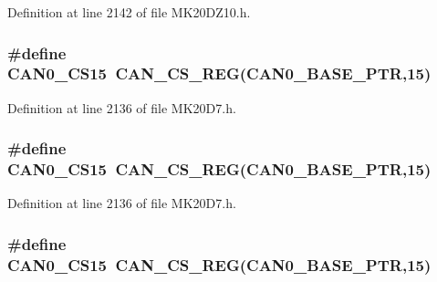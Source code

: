 Definition at line 2142 of file M\+K20\+D\+Z10.\+h.

\subsubsection[{\texorpdfstring{C\+A\+N0\+\_\+\+C\+S15}{CAN0_CS15}}]{\setlength{\rightskip}{0pt plus 5cm}\#define C\+A\+N0\+\_\+\+C\+S15~{\bf C\+A\+N\+\_\+\+C\+S\+\_\+\+R\+EG}({\bf C\+A\+N0\+\_\+\+B\+A\+S\+E\+\_\+\+P\+TR},15)}\hypertarget{group___c_a_n___register___accessor___macros_ga15aff9b7ca3d53a473e297a190ca5947}{}\label{group___c_a_n___register___accessor___macros_ga15aff9b7ca3d53a473e297a190ca5947}


Definition at line 2136 of file M\+K20\+D7.\+h.

\subsubsection[{\texorpdfstring{C\+A\+N0\+\_\+\+C\+S15}{CAN0_CS15}}]{\setlength{\rightskip}{0pt plus 5cm}\#define C\+A\+N0\+\_\+\+C\+S15~{\bf C\+A\+N\+\_\+\+C\+S\+\_\+\+R\+EG}({\bf C\+A\+N0\+\_\+\+B\+A\+S\+E\+\_\+\+P\+TR},15)}\hypertarget{group___c_a_n___register___accessor___macros_ga15aff9b7ca3d53a473e297a190ca5947}{}\label{group___c_a_n___register___accessor___macros_ga15aff9b7ca3d53a473e297a190ca5947}


Definition at line 2136 of file M\+K20\+D7.\+h.

\subsubsection[{\texorpdfstring{C\+A\+N0\+\_\+\+C\+S15}{CAN0_CS15}}]{\setlength{\rightskip}{0pt plus 5cm}\#define C\+A\+N0\+\_\+\+C\+S15~{\bf C\+A\+N\+\_\+\+C\+S\+\_\+\+R\+EG}({\bf C\+A\+N0\+\_\+\+B\+A\+S\+E\+\_\+\+P\+TR},15)}\hypertarget{group___c_a_n___register___accessor___macros_ga15aff9b7ca3d53a473e297a190ca5947}{}\label{group___c_a_n___register___accessor___macros_ga15aff9b7ca3d53a473e297a190ca5947}


